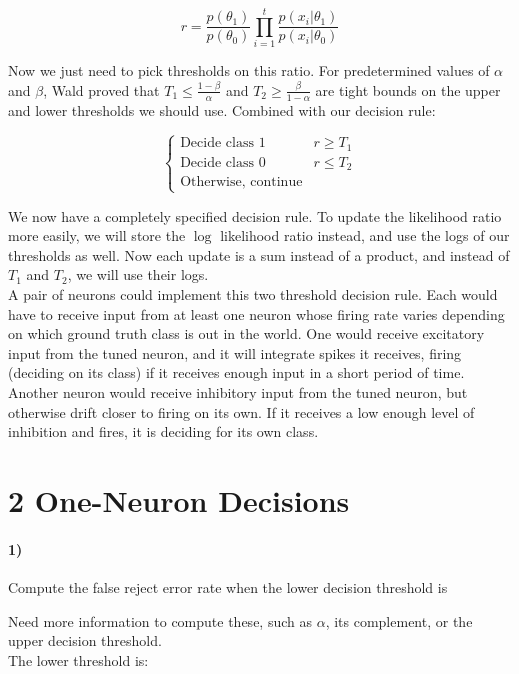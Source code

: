 \documentclass[10pt,letter]{article}
\begin{document}
\[ r = \frac{p(\theta_1)}{p(\theta_0)}\prod_{i=1}^{t}\frac{p(x_i | \theta_1)}{p(x_i | \theta_0)}\]

Now we just need to pick thresholds on this ratio.  For predetermined values of $\alpha$ and 
$\beta$, Wald proved that $T_1 \leq \frac{1 - \beta}{\alpha}$ and $T_2 \geq \frac{\beta}
{1 - \alpha}$ are tight bounds on the upper and lower thresholds we should use. Combined with 
our decision rule:

\[ \begin{cases}
   \text{Decide class 1} & r \geq T_1 \\
   \text{Decide class 0} & r \leq T_2 \\
   \text{Otherwise, continue}
   \end{cases}
\]

We now have a completely specified decision rule.  To update the likelihood ratio more easily, 
we will store the $\log$ likelihood ratio instead, and use the logs of our thresholds as well.  
Now each update is a sum instead of a product, and instead of $T_1$ and $T_2$, we will use their
logs.\\

A pair of neurons could implement this two threshold decision rule. Each would have to receive input 
from at least one neuron whose firing rate varies depending on which ground truth class is out in 
the world.  One would receive excitatory input from the tuned neuron, and it will integrate spikes 
it receives, firing (deciding on its class) if it receives enough input in a short period of time.  
Another neuron would receive inhibitory input from the tuned neuron, but otherwise drift closer to firing on its own.  If it receives a low enough level of inhibition and fires, it is deciding for its 
own class.

\section*{2 One-Neuron Decisions}

\paragraph{1)} Compute the false reject error rate when the lower decision threshold is

Need more information to compute these, such as $\alpha$, its complement,  or the upper decision
threshold. \\

The lower threshold is:
\end{document}
